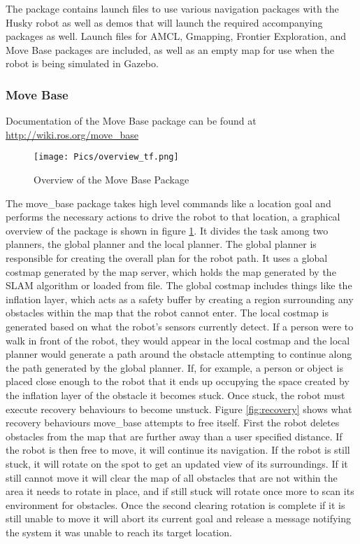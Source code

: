
The package contains launch files to use various navigation packages with the Husky robot as well as demos that will launch the required accompanying packages as well. Launch files for AMCL, Gmapping, Frontier Exploration, and Move Base packages are included, as well as an empty map for use when the robot is being simulated in Gazebo.\\ 

\subsubsection{Move Base}

Documentation of the Move Base package can be found at \url{http://wiki.ros.org/move_base}\\

\begin{figure}[H]
    \centering
    \texttt{[image: Pics/overview\_tf.png]}
    \caption{Overview of the Move Base Package \cite{rosmovebase}}
    \label{fig:movebaseoverview}
\end{figure}

The move\_base package takes high level commands like a location goal and performs the necessary actions to drive the robot to that location, a graphical overview of the package is shown in figure \ref{fig:movebaseoverview}. It divides the task among two planners, the global planner and the local planner. The global planner is responsible for creating the overall plan for the robot path. It uses a global costmap generated by the map server, which holds the map generated by the SLAM algorithm or loaded from file. The global costmap includes things like the inflation layer, which acts as a safety buffer by creating a region surrounding any obstacles within the map that the robot cannot enter. The local costmap is generated based on what the robot's sensors currently detect. If a person were to walk in front of the robot, they would appear in the local costmap and the local planner would generate a path around the obstacle attempting to continue along the path generated by the global planner. If, for example, a person or object is placed close enough to the robot that it ends up occupying the space created by the inflation layer of the obstacle it becomes stuck. Once stuck, the robot must execute recovery behaviours to become unstuck. Figure \ref{fig:recovery} shows what recovery behaviours move\_base attempts to free itself. First the robot deletes obstacles from the map that are further away than a user specified distance. If the robot is then free to move, it will continue its navigation. If the robot is still stuck, it will rotate on the spot to get an updated view of its surroundings. If it still cannot move it will clear the map of all obstacles that are not within the area it needs to rotate in place, and if still stuck will rotate once more to scan its environment for obstacles. Once the second clearing rotation is complete if it is still unable to move it will abort its current goal and release a message notifying the system it was unable to reach its target location.\\

